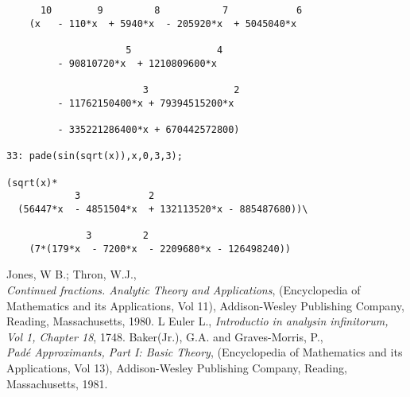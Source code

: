 \begin{verbatim}
      10        9         8           7            6
    (x   - 110*x  + 5940*x  - 205920*x  + 5045040*x

                     5               4
         - 90810720*x  + 1210809600*x 

                        3               2
         - 11762150400*x + 79394515200*x  

         - 335221286400*x + 670442572800)

33: pade(sin(sqrt(x)),x,0,3,3);
        
(sqrt(x)*
            3            2
  (56447*x  - 4851504*x  + 132113520*x - 885487680))\

              3         2
    (7*(179*x  - 7200*x  - 2209680*x - 126498240))
\end{verbatim}


\begin{thebibliography}{9}
 Jones, W B.; Thron, W.J., \\
{\it Continued fractions. Analytic Theory and Applications},
 (Encyclopedia of Mathematics and its Applications, Vol 11),
Addison-Wesley Publishing Company, Reading, Massachusetts, 1980.
 L Euler L., {\it Introductio in analysin infinitorum, Vol 1,
 Chapter 18}, 1748.
 Baker(Jr.), G.A. and Graves-Morris, P.,\\
{\it Pad\'{e} Approximants, Part I: Basic Theory},
(Encyclopedia of Mathematics and its Applications, Vol 13),
Addison-Wesley Publishing Company, Reading, Massachusetts, 1981.
\end{thebibliography}
